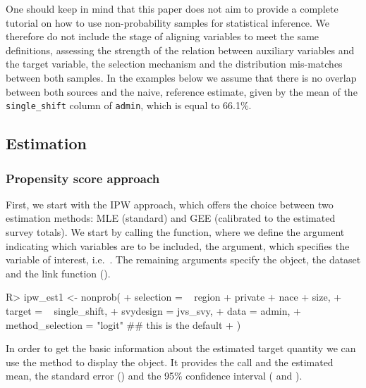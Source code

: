 \documentclass[
]{jss}
\begin{document}
One should keep in mind that this paper does not aim to provide a
complete tutorial on how to use non-probability samples for statistical
inference. We therefore do not include the stage of aligning variables
to meet the same definitions, assessing the strength of the relation
between auxiliary variables and the target variable, the selection
mechanism and the distribution mis-matches between both samples. In the
examples below we assume that there is no overlap between both sources
and the naive, reference estimate, given by the mean of the
\texttt{single\_shift} column of \texttt{admin}, which is equal to
66.1\%.

\subsection{Estimation}\label{estimation}

\subsubsection{Propensity score
approach}\label{propensity-score-approach}

First, we start with the IPW approach, which offers the choice between
two estimation methods: MLE (standard) and GEE (calibrated to the
estimated survey totals). We start by calling the 
function, where we define the  argument indicating which
variables are to be included, the  argument, which
specifies the variable of interest, i.e.~. The
remaining arguments specify the  object, the dataset and
the link function ().

\begin{CodeChunk}
\begin{CodeInput}
R> ipw_est1 <- nonprob(
+   selection = ~ region + private + nace + size,
+   target = ~ single_shift,
+   svydesign = jvs_svy,
+   data = admin,
+   method_selection = "logit" ## this is the default
+ )
\end{CodeInput}
\end{CodeChunk}

In order to get the basic information about the estimated target
quantity we can use the  method to display the object. It
provides the call and the estimated mean, the standard error ()
and the 95\% confidence interval ( and
).
\end{document}
